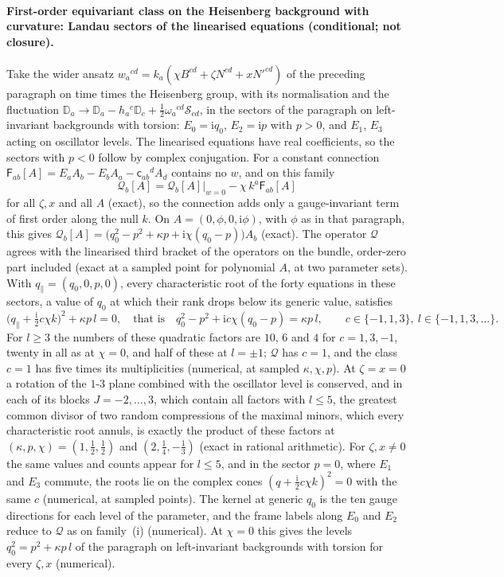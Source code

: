 \paragraph{First-order equivariant class on the Heisenberg background with curvature: Landau sectors of the linearised equations (conditional; not closure).}
Take the wider ansatz \(w_a{}^{cd}=k_a(\chi B^{cd}+\zeta N^{cd}+xN'^{cd})\) of the preceding paragraph on time times the Heisenberg group, with its normalisation and the fluctuation \(\mathbb D_a\to\mathbb D_a-h_a{}^c\mathbb D_c+\tfrac12\omega_a{}^{cd}\mathcal S_{cd}\), in the sectors of the paragraph on left-invariant backgrounds with torsion: \(E_0=\mathrm iq_0\), \(E_2=\mathrm ip\) with \(p>0\), and \(E_1\), \(E_3\) acting on oscillator levels. The linearised equations have real coefficients, so the sectors with \(p<0\) follow by complex conjugation. For a constant connection \(\mathsf F_{ab}[A]=E_aA_b-E_bA_a-\mathsf c_{ab}{}^dA_d\) contains no \(w\), and on this family
\[
\mathcal Q_b[A]=\mathcal Q_b[A]\big|_{w=0}-\chi\,k^a\mathsf F_{ab}[A]
\]
for all \(\zeta,x\) and all \(A\) (exact), so the connection adds only a gauge-invariant term of first order along the null \(k\). On \(A=(0,\phi,0,\mathrm i\phi)\), with \(\phi\) as in that paragraph, this gives \(\mathcal Q_b[A]=\bigl(q_0^2-p^2+\kappa p+\mathrm i\chi(q_0-p)\bigr)A_b\) (exact). The operator \(\mathcal Q\) agrees with the linearised third bracket of the operators on the bundle, order-zero part included (exact at a sampled point for polynomial \(A\), at two parameter sets). With \(q_\parallel=(q_0,0,p,0)\), every characteristic root of the forty equations in these sectors, a value of \(q_0\) at which their rank drops below its generic value, satisfies
\[
\bigl(q_\parallel+\tfrac{\mathrm i}2c\chi k\bigr)^2+\kappa p\,l=0,\quad\text{that is}\quad q_0^2-p^2+\mathrm ic\chi(q_0-p)=\kappa p\,l,\qquad c\in\{-1,1,3\},\ l\in\{-1,1,3,\dots\}.
\]
For \(l\ge3\) the numbers of these quadratic factors are \(10\), \(6\) and \(4\) for \(c=1,3,-1\), twenty in all as at \(\chi=0\), and half of these at \(l=\pm1\); \(\mathcal Q\) has \(c=1\), and the class \(c=1\) has five times its multiplicities (numerical, at sampled \(\kappa,\chi,p\)). At \(\zeta=x=0\) a rotation of the \(1\)-\(3\) plane combined with the oscillator level is conserved, and in each of its blocks \(J=-2,\dots,3\), which contain all factors with \(l\le5\), the greatest common divisor of two random compressions of the maximal minors, which every characteristic root annuls, is exactly the product of these factors at \((\kappa,p,\chi)=(1,\tfrac12,\tfrac12)\) and \((2,\tfrac14,-\tfrac13)\) (exact in rational arithmetic). For \(\zeta,x\neq0\) the same values and counts appear for \(l\le5\), and in the sector \(p=0\), where \(E_1\) and \(E_3\) commute, the roots lie on the complex cones \((q+\tfrac{\mathrm i}2c\chi k)^2=0\) with the same \(c\) (numerical, at sampled points). The kernel at generic \(q_0\) is the ten gauge directions for each level of the parameter, and the frame labels along \(E_0\) and \(E_2\) reduce to \(\mathcal Q\) as on family~(i) (numerical). At \(\chi=0\) this gives the levels \(q_0^2=p^2+\kappa p\,l\) of the paragraph on left-invariant backgrounds with torsion for every \(\zeta,x\) (numerical).

